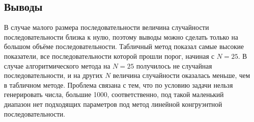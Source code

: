 \subsection*{Выводы}
В случае малого размера последовательности величина случайности последовательности близка к нулю, поэтому выводы можно сделать только на большом объёме последовательности.
Табличный метод показал самые высокие показатели, все последовательности которой прошли порог, начиная с $N = 25$. 
В случае алгоритмического метода на $N = 25$ получилось не случайная последовательности, и на других $N$ величина случайности оказалась меньше, чем в табличном методе.
Проблема связана с тем, что по условию задачи нельзя генерировать числа, большие 1000, соответственно, под такой маленький диапазон нет подходящих параметров под метод линейной конгруэнтной последовательности.
